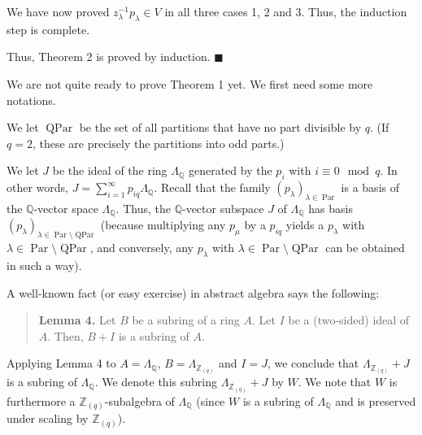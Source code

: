\documentclass[10pt,a4paper]{article}
\begin{document}
We have now proved $z_{\lambda}^{-1}p_{\lambda}\in V$ in all three cases 1, 2
and 3. Thus, the induction step is complete.




Thus, Theorem 2 is proved by induction. $\blacksquare$




We are not quite ready to prove Theorem 1 yet. We first need some more notations.




We let $\operatorname{QPar}$ be the set of all partitions that have no part
divisible by $q$. (If $q=2$, these are precisely the partitions into odd parts.)




We let $J$ be the ideal of the ring $\Lambda_{\mathbb{Q}}$ generated by the
$p_{i}$ with $i\equiv0\mod q$. In other words, $J=\sum\limits_{i=1}^{\infty}p_{iq}\Lambda_{\mathbb{Q}}$. Recall that the family $\left(
p_{\lambda}\right)  _{\lambda\in\operatorname{Par}}$ is a basis of the
$\mathbb{Q}$-vector space $\Lambda_{\mathbb{Q}}$. Thus, the $\mathbb{Q}
$-vector subspace $J$ of $\Lambda_{\mathbb{Q}}$ has basis $\left(  p_{\lambda
}\right)  _{\lambda\in\operatorname{Par}\setminus\operatorname{QPar}}$
(because multiplying any $p_{\mu}$ by a $p_{iq}$ yields a $p_{\lambda}$ with
$\lambda\in\operatorname{Par}\setminus\operatorname{QPar}$, and conversely,
any $p_{\lambda}$ with $\lambda \in \operatorname{Par}\setminus\operatorname{QPar}$ can
be obtained in such a way).




A well-known fact (or easy exercise) in abstract algebra says the following:



\begin{quote}



\textbf{Lemma 4.} Let $B$ be a subring of a ring $A$. Let $I$ be a (two-sided)
ideal of $A$. Then, $B+I$ is a subring of $A$.



\end{quote}



Applying Lemma 4 to $A=\Lambda_{\mathbb{Q}}$, $B=\Lambda_{\mathbb{Z}_{\left(
q\right)  }}$ and $I=J$, we conclude that $\Lambda_{\mathbb{Z}_{\left(
q\right)  }}+J$ is a subring of $\Lambda_{\mathbb{Q}}$. We denote this subring
$\Lambda_{\mathbb{Z}_{\left(  q\right)  }}+J$ by $W$. We note that $W$ is
furthermore a $\mathbb{Z}_{\left(  q\right)  }$-subalgebra of $\Lambda
_{\mathbb{Q}}$ (since $W$ is a subring of $\Lambda_{\mathbb{Q}}$ and is
preserved under scaling by $\mathbb{Z}_{\left(  q\right)  }$).
\end{document}
